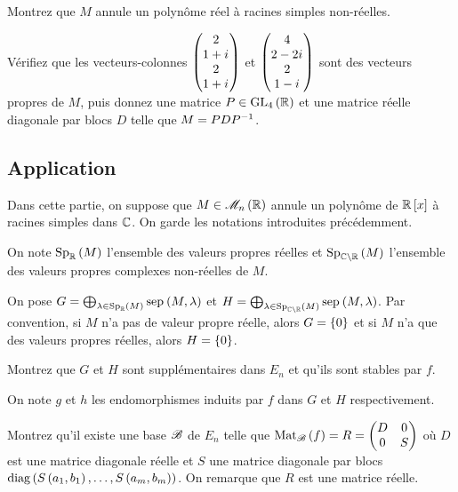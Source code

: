 \begin{q}
Montrez que \(M\) annule un polynôme réel à racines simples non-réelles.

Vérifiez que les vecteurs-colonnes \(\begin{pmatrix}2 \\ 1+i\mkern1mu \\ 2 \\ 1+i\mkern1mu\end{pmatrix}\) et \(\begin{pmatrix}4 \\ 2-2i\mkern1mu \\ 2 \\ 1-i\mkern1mu\end{pmatrix}\) sont des vecteurs propres de \(M\), puis donnez une matrice \(P\in\GL{4}[\R]\) et une matrice réelle diagonale par blocs \(D\) telle que \(M=PDP^{-1}\).
\end{q}



\subsection*{Application}

Dans cette partie, on suppose que \(M\in\M{n}[\R]\) annule un polynôme de \(\poly[\R][x]\) à racines simples dans \(\mathbb{C}\). On garde les notations introduites précédemment.

On note \(\Sp[\R]{M}\) l'ensemble des valeurs propres réelles et \(\Sp[\C\excluant\R]{M}\) l'ensemble des valeurs propres complexes non-réelles de \(M\).

\begin{q}
On pose \(G=\bigoplus_{\lambda\in\Sp[\R]{M}}\sep{M}{\lambda}\) et \(H=\bigoplus_{\lambda\in\Sp[\C\excluant\R]{M}}\sep{M}{\lambda}\). Par convention, si \(M\) n'a pas de valeur propre réelle, alors \(G=\left\lbrace0\right\rbrace\) et si \(M\) n'a que des valeurs propres réelles, alors \(H=\left\lbrace0\right\rbrace\).

Montrez que \(G\) et \(H\) sont supplémentaires dans \(E_n\) et qu'ils sont stables par \(f\).

On note \(g\) et \(h\) les endomorphismes induits par \(f\) dans \(G\) et \(H\) respectivement.
\end{q}



\begin{q}
Montrez qu'il existe une base \(\mathscr{B}\) de \(E_n\) telle que \(\Mat{f}=R=\begin{pmatrix}D & 0 \\ 0 & S\end{pmatrix}\) où \(D\) est une matrice diagonale réelle et \(S\) une matrice diagonale par blocs \(\operatorname{diag}\left(S\left(a_1,b_1\right),\dots,S\left(a_m,b_m\right)\right)\). On remarque que \(R\) est une matrice réelle.
\end{q}



